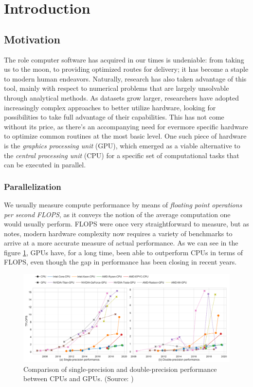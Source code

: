 \documentclass[11pt, conference, onecolumn, final]{IEEEtran}
\begin{document}
\listoftodos

\section{Introduction} \label{sec:intro}

\subsection{Motivation} \label{sec:intro:motivation}

The role computer software has acquired in our times is undeniable:
from taking us to the moon, to providing optimized routes for delivery; it has
become a staple to modern human endeavors.
Naturally, research has also taken advantage of this tool, mainly with
respect to numerical problems that are largely unsolvable through analytical
methods.
As datasets grow larger, researchers have adopted increasingly complex
approaches to better utilize hardware, looking for possibilities to take full
advantage of their capabilities.
This has not come without its price, as there's an accompanying need for
evermore specific hardware to optimize common routines at the most basic level.
One such piece of hardware is the \textit{graphics processing unit} (GPU),
which emerged as a viable alternative to the \textit{central processing unit}
(CPU) for a specific set of computational tasks that can be executed in
parallel.

\subsubsection{Parallelization} \label{sec:motivation:parallelization}

We usually measure compute performance by means of \textit{floating point
operations per second} \textit{FLOPS}, as it conveys the notion of the average
computation one would usually perform.
FLOPS were once very straightforward to measure, but as
\cite{dolbeau2018theoretical} notes, modern hardware complexity now
requires a variety of benchmarks to arrive at a more accurate measure of actual
performance.
As we can see in the figure \cref{fig:cpu-vs-gpu-flops}, GPUs have, for a long
time, been able to outperform CPUs in terms of FLOPS, even though the gap in
performance has been closing in recent years.

\begin{figure}[ht]
    \centering
    \includegraphics[width=0.9\linewidth]{gpu-vs-cpu-flops.png}
    \caption{Comparison of single-precision and double-precision performance
    between CPUs and GPUs. (Source: \cite{sun2019summarizing})}
    \label{fig:cpu-vs-gpu-flops}
\end{figure}
\end{document}
